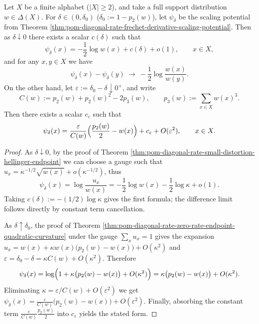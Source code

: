 

\begin{theorem}\label{thm:pom-diagonal-rate-scaling-potential-endpoints}
Let \(X\) be a finite alphabet (\(|X|\ge 2\)), and take a full support distribution \(w\in\Delta(X)\).
For \(\delta\in(0,\delta_0)\) (\(\delta_0:=1-p_2(w)\)), let \(\psi_\delta\) be the scaling potential from Theorem \ref{thm:pom-diagonal-rate-frechet-derivative-scaling-potential}.
Then as \(\delta\downarrow 0\) there exists a scalar \(c(\delta)\) such that
\[
\psi_\delta(x)= -\frac12\log w(x)+c(\delta)+o(1),\qquad x\in X,
\]
and for any \(x,y\in X\) we have
\[
\psi_\delta(x)-\psi_\delta(y)\ \longrightarrow\ -\frac12\log\frac{w(x)}{w(y)}.
\]
On the other hand, let \(\varepsilon:=\delta_0-\delta\downarrow 0^+\), and write
\[
C(w):=p_2(w)+p_2(w)^2-2p_3(w),\qquad p_3(w):=\sum_{x\in X}w(x)^3.
\]
Then there exists a scalar \(c_\varepsilon\) such that
\[
\psi_\delta(x)=\frac{\varepsilon}{C(w)}\Bigl(\frac{p_2(w)}{2}-w(x)\Bigr)+c_\varepsilon+O(\varepsilon^2),
\qquad x\in X.
\]
\end{theorem}
\begin{proof}
As \(\delta\downarrow 0\), by the proof of Theorem \ref{thm:pom-diagonal-rate-small-distortion-hellinger-endpoint} we can choose a gauge such that \(u_x=\kappa^{-1/2}\sqrt{w(x)}+o(\kappa^{-1/2})\), thus
\[
\psi_\delta(x)=\log\frac{u_x}{w(x)}=-\frac12\log w(x)-\frac12\log\kappa+o(1).
\]
Taking \(c(\delta):=-(1/2)\log\kappa\) gives the first formula; the difference limit follows directly by constant term cancellation.
\par
As \(\delta\uparrow\delta_0\), the proof of Theorem \ref{thm:pom-diagonal-rate-zero-rate-endpoint-quadratic-curvature} under the gauge \(\sum_x u_x=1\) gives the expansion
\(
u_x=w(x)+\kappa w(x)\bigl(p_2(w)-w(x)\bigr)+O(\kappa^2)
\)
and
\(
\varepsilon=\delta_0-\delta=\kappa C(w)+O(\kappa^2)
\).
Therefore
\[
\psi_\delta(x)=\log\Bigl(1+\kappa\bigl(p_2(w)-w(x)\bigr)+O(\kappa^2)\Bigr)
=\kappa\bigl(p_2(w)-w(x)\bigr)+O(\kappa^2).
\]
Eliminating \(\kappa=\varepsilon/C(w)+O(\varepsilon^2)\) we get
\(
\psi_\delta(x)=\frac{\varepsilon}{C(w)}\bigl(p_2(w)-w(x)\bigr)+O(\varepsilon^2)
\).
Finally, absorbing the constant term \(\frac{\varepsilon}{C(w)}\frac{p_2(w)}{2}\) into \(c_\varepsilon\) yields the stated form.
\end{proof}

